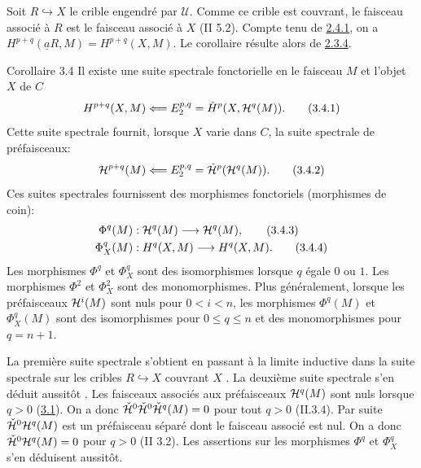 \documentclass[10pt]{../fichiers-configuration-latex/smfart}
\begin{document}
Soit \pageoriginale $R \hookrightarrow X$ le crible engendré par
$\mathcal{U}$. Comme ce crible est couvrant, le faisceau associé à
$R$ est le faisceau associé à $X$ (II 5.2). Compte tenu de \hyperref[V.subsubsec2.4.1]{2.4.1},
on a $H^{p + q}(\underline{a} R, M) = H^{p + q}(X, M)$. Le corollaire résulte
alors de \hyperref[V.prop2.3.4]{2.3.4}.

\begin{enonce*}{Corollaire 3.4}
Il existe une suite spectrale fonctorielle en le faisceau $M$ et
l'objet $X$ de $C$
\begin{equation}
H^{p + q}(X, M) \Longleftarrow E^{p, q}_2 = \check{H}^p(X,
{\mathcal H}^q (M)){}.\tag{3.4.1}
\end{equation}
Cette suite spectrale fournit, lorsque $X$ varie dans $C$, la suite
spectrale de préfaisceaux:
\begin{equation}
{\mathcal H}^{p + q} (M)\Longleftarrow E^{p,q}_2 =
\check{{\mathcal H}}^p({\mathcal H}^q(M)){}.
\tag{3.4.2}
\end{equation}
Ces suites spectrales fournissent des morphismes fonctoriels
(morphismes de coin):
\begin{align*}%
\Phi^q(M) &: \Hh^q(M) \to \Hh^q(M){\quoi},\tag{3.4.3}\\
\Phi^q_X(M) &: H^q (X, M) \to H^q (X, M){\quoi}.\tag{3.4.4}
\end{align*}
 Les morphismes $\Phi^q$ et $\Phi^q_X$ sont des isomorphismes lorsque
$q$ égale $0$ ou $1$. Les morphismes $\Phi^2$ et $\Phi^2_X$ sont des
monomorphismes. Plus généralement, lorsque les préfaisceaux
${\mathcal H}^i(M)$ sont nuls pour $0 < i < n$, les morphismes $\Phi^q(M)$
et $\Phi^q_X(M)$ sont des isomorphismes pour $0 \leq q \leq n$ et des
monomorphismes pour $q = n + 1$.
\end{enonce*}

La première suite spectrale s'obtient en passant à la limite
inductive dans la suite spectrale  sur les cribles $R
\hookrightarrow X$ couvrant $X$ . La deuxième suite
spectrale s'en déduit aussitôt . Les faisceaux
associés aux préfaisceaux ${\mathcal H}^q (M)$ sont nuls lorsque $q > 0$
(\hyperref[V.prop3.1]{3.1}). On a donc $\check{{\mathcal H}}^{0}
\check{{\mathcal H}}^{0} \check{{\mathcal H}}^{q} (M) = 0$ pour tout $q > 0$
(II.3.4). Par suite $\check{{\mathcal H}}^{0} {\mathcal H}^{q} (M)$ est un préfaisceau séparé dont le faisceau associé est nul. On a donc $\check{{\mathcal H}}^{0} {\mathcal H}^{q} (M) = 0$
pour $q > 0$ (II 3.2). Les assertions sur les morphismes $\Phi^q$ et
$\Phi^q_X$ s'en déduisent aussitôt.
\end{document}
